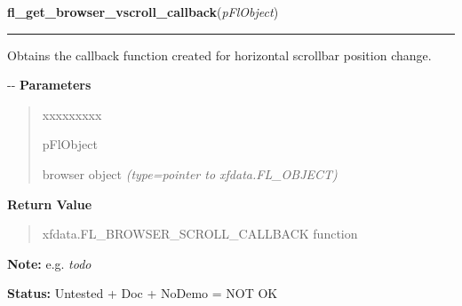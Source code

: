 \hspace{.8\funcindent}\begin{boxedminipage}{\funcwidth}

    \raggedright \textbf{fl\_get\_browser\_vscroll\_callback}(\textit{pFlObject})

    \vspace{-1.5ex}

    \rule{\textwidth}{0.5\fboxrule}
\setlength{\parskip}{2ex}

Obtains the callback function created for horizontal scrollbar position
change.

-{}-
\setlength{\parskip}{1ex}
      \textbf{Parameters}
      \vspace{-1ex}

      \begin{quote}
        \begin{Ventry}{xxxxxxxxx}

          \item[pFlObject]


browser object
            {\it (type=pointer to xfdata.FL\_OBJECT)}

        \end{Ventry}

      \end{quote}

      \textbf{Return Value}
    \vspace{-1ex}

      \begin{quote}

xfdata.FL\_BROWSER\_SCROLL\_CALLBACK function
      \end{quote}

\textbf{Note:} 
e.g. \emph{todo}


\textbf{Status:} 
Untested + Doc + NoDemo = NOT OK


    \end{boxedminipage}

